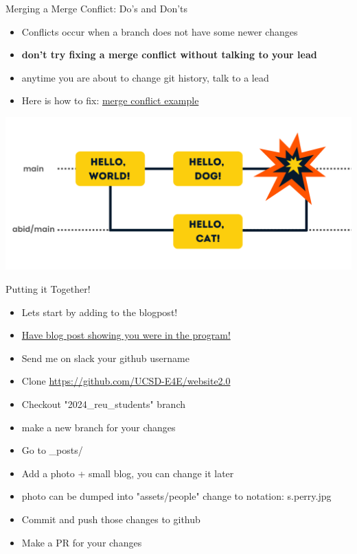 \documentclass[aspectratio=169]{beamer}
\begin{document}
\begin{frame}{Merging a Merge Conflict: Do's and Don'ts}
    \begin{itemize}
        \item Conflicts occur when a branch does not have some newer changes
        \item \textbf{don't try fixing a merge conflict without talking to your lead}
        \item anytime you are about to change git history, talk to a lead
        \item Here is how to fix: \href{https://github.com/UCSD-E4E/website2.0/pull/144}{merge conflict example}
    \end{itemize}
    \begin{center}
        \includegraphics[scale=.25]{merge_conflict_datacamp.png}
    \end{center}
\end{frame}

\begin{frame}{Putting it Together!}
    \begin{itemize}
        \item Lets start by adding to the blogpost!
        \item \href{https://e4e.ucsd.edu/news-and-updates/2023-summer-research-students}{Have blog post showing you were in the program!} 
        \item Send me on slack your github username
        \item Clone \href{https://github.com/UCSD-E4E/website2.0}{https://github.com/UCSD-E4E/website2.0}
        \item Checkout "2024\_reu\_students" branch
        \item make a new branch for your changes
        \item Go to \_posts/
        \item Add a photo + small blog, you can change it later
        \item photo can be dumped into "assets/people" change to notation: s.perry.jpg
        \item Commit and push those changes to github
        \item Make a PR for your changes
    \end{itemize}
\end{frame}
\end{document}
